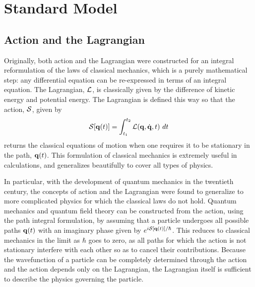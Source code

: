 \chapter{Standard Model}

\label{ch:standardmodel}

%
\section{Action and the Lagrangian}

Originally, both action and the Lagrangian were constructed for an integral reformulation of the laws of classical mechanics, which is a purely mathematical step: any differential equation can be re-expressed in terms of an integral equation. 
The Lagrangian, $\mathcal{L}$, is classically given by the difference of  kinetic energy and potential energy. 
The Lagrangian is defined this way so that the action, $\mathcal{S}$, given by 
\begin{equation}\label{eq:action}
 \mS[\vect{q}(t)] = \int_{t_1}^{t_2} \mL(\vect{q},\dot{\vect{q}},t)\ dt
\end{equation}
\noindent returns the classical equations of motion when one requires it to be stationary in the path, $\mathbf{q}(t)$. 
This formulation of classical mechanics is extremely useful in calculations, and generalizes beautifully to cover all types of physics.

In particular, with the development of quantum mechanics in the twentieth century, the concepts of action and the Lagrangian were found to generalize to more complicated physics for which the classical laws do not hold. 
Quantum mechanics and quantum field theory can be constructed from the action, using the path integral formulation, by assuming that a particle undergoes all possible paths $\mathbf{q}(t)$ with an imaginary phase given by $e^{i \mathcal{S}[\mathbf{q}(t)]/\hbar}$. 
This reduces to classical mechanics in the limit as $\hbar$ goes to zero, as all paths for which the action is not stationary interfere with each other so as to cancel their contributions. 
Because the  wavefunction of a particle can be completely determined through the action and the action depends only on the Lagrangian, the Lagrangian itself is sufficient to describe the physics governing the particle. 

